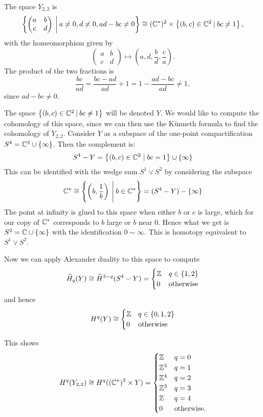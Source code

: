 \begin{example}
  \label{ex:22}

  The space $Y_{2,2}$ is
  \[ \left\{ 
    \begin{pmatrix}
      a & b \\
      c & d
    \end{pmatrix} \:\bigg\vert\: a \neq 0, d \neq 0, ad-bc
    \neq 0  \right\} \cong (\mathbb{C}^*)^2 \times \left\{ (b,c)\in\mathbb{C}^2 \:\vert\:
    bc \neq 1 \right\}, \]
  with the homeomorphism given by
  \[
  \begin{pmatrix}
    a & b\\
    c & d
  \end{pmatrix} \mapsto \left(a,d,\frac{b}{d},\frac{c}{a}\right).\]
  The product of the two fractions is
  \[ \frac{bc}{ad} = \frac{bc-ad}{ad} + 1 = 1-\frac{ad-bc}{ad} \neq
  1, \]
  since $ad-bc \neq 0$.

  The space $\left\{ (b,c) \in \mathbb{C}^2 \:\vert\: bc\neq 1 \right\}$ will be
  denoted $Y$. We would like to compute the cohomology of this space,
  since we can then use the K\"unneth formula to find the cohomology
  of $Y_{2,2}$.
  Consider $Y$ as a subspace of
  the one-point compactification $S^4 = \mathbb{C}^2\cup\left\{ \infty \right\}$. Then the
  complement is:
  \[ S^4-Y = \left\{ (b,c)\in \mathbb{C}^2 \mid bc=1 \right\}\cup\left\{ \infty \right\} \]
  This can be identified with the wedge sum $S^1\vee S^2$ by considering
  the subspace
  \[ \mathbb{C}^* \cong \left\{ \left(b,\frac{1}{b} \right) \:\Bigg\vert\: b\in \mathbb{C}^* \right\} =
  (S^4-Y)-\left\{ \infty \right\} \]
  The point at infinity is glued to this space when either $b$ or $c$
  is large, which for our copy of $\mathbb{C}^*$
  corresponds to $b$ large or $b$ near 0. Hence what we get is
  $S^2=\mathbb{C}\cup\left\{ \infty \right\}$ with the identification $0 \sim \infty$. This
  is homotopy equivalent to $S^1\vee S^2$.
  
  Now we can apply Alexander duality to this space to compute
  \[ \widetilde H_q(Y) \cong \widetilde H^{3-q}(S^4-Y) =
  \begin{cases}
    \mathbb{Z} & q \in \left\{ 1,2 \right\} \\
    0 & \text{otherwise}
  \end{cases} \]
  and hence
  \[ H^q(Y) \cong
  \begin{cases}
    \mathbb{Z} & q \in \left\{ 0,1,2 \right\} \\
    0 & \text{otherwise}
  \end{cases} \]
  
  This shows
  \[ H^q(Y_{2,2}) \cong H^q((\mathbb{C}^*)^2\times Y) =
  \begin{cases}
    \mathbb{Z} & q=0 \\
    \mathbb{Z}^3 & q = 1 \\
    \mathbb{Z}^4 & q = 2 \\
    \mathbb{Z}^3 & q = 3 \\
    \mathbb{Z} & q =4 \\
    0 & \text{otherwise}.
  \end{cases} \]
\end{example}

